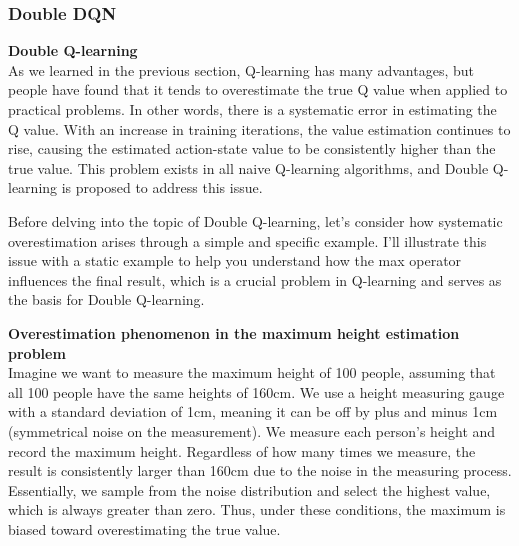 \documentclass{article}
\begin{document}
\newpage
\subsubsection{Double DQN}


\noindent
    \textbf{Double Q-learning}\\
    \noindent
As we learned in the previous section, Q-learning has many advantages, but people have found that it tends to overestimate the true Q value when applied to practical problems. In other words, there is a systematic error in estimating the Q value. With an increase in training iterations, the value estimation continues to rise, causing the estimated action-state value to be consistently higher than the true value. This problem exists in all naive Q-learning algorithms, and Double Q-learning is proposed to address this issue.

Before delving into the topic of Double Q-learning, let's consider how systematic overestimation arises through a simple and specific example. I'll illustrate this issue with a static example to help you understand how the max operator influences the final result, which is a crucial problem in Q-learning and serves as the basis for Double Q-learning.

\hspace*{\fill}

\begin{mdframed}[hidealllines=true,backgroundcolor=gray!20]
\textbf{Overestimation phenomenon in the maximum height estimation problem } \\
Imagine we want to measure the maximum height of 100 people, assuming that all 100 people have the same heights of 160cm. We use a height measuring gauge with a standard deviation of 1cm, meaning it can be off by plus and minus 1cm (symmetrical noise on the measurement). We measure each person's height and record the maximum height. Regardless of how many times we measure, the result is consistently larger than 160cm due to the noise in the measuring process. Essentially, we sample from the noise distribution and select the highest value, which is always greater than zero. Thus, under these conditions, the maximum is biased toward overestimating the true value.
\end{mdframed}

\hspace*{\fill}
\end{document}

